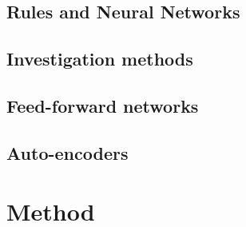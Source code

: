 



\subsection{Rules and Neural Networks}





\subsection{Investigation methods}



\subsection{Feed-forward networks}








\subsection{Auto-encoders}





\section{Method}

